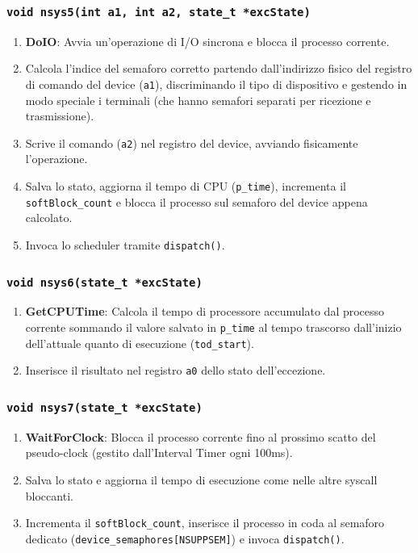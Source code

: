 \documentclass[a4paper,12pt]{article}
\begin{document}
\subsubsection{\texttt{void nsys5(int a1, int a2, state\_t *excState)}}
\begin{enumerate}
    \item \textbf{DoIO}: Avvia un'operazione di I/O sincrona e blocca il processo corrente.
    \item Calcola l'indice del semaforo corretto partendo dall'indirizzo fisico del registro di comando del device (\texttt{a1}), discriminando il tipo di dispositivo e gestendo in modo speciale i terminali (che hanno semafori separati per ricezione e trasmissione).
    \item Scrive il comando (\texttt{a2}) nel registro del device, avviando fisicamente l'operazione.
    \item Salva lo stato, aggiorna il tempo di CPU (\texttt{p\_time}), incrementa il \texttt{softBlock\_count} e blocca il processo sul semaforo del device appena calcolato.
    \item Invoca lo scheduler tramite \texttt{dispatch()}.
\end{enumerate}

\subsubsection{\texttt{void nsys6(state\_t *excState)}}
\begin{enumerate}
    \item \textbf{GetCPUTime}: Calcola il tempo di processore accumulato dal processo corrente sommando il valore salvato in \texttt{p\_time} al tempo trascorso dall'inizio dell'attuale quanto di esecuzione (\texttt{tod\_start}).
    \item Inserisce il risultato nel registro \texttt{a0} dello stato dell'eccezione.
\end{enumerate}

\subsubsection{\texttt{void nsys7(state\_t *excState)}}
\begin{enumerate}
    \item \textbf{WaitForClock}: Blocca il processo corrente fino al prossimo scatto del pseudo-clock (gestito dall'Interval Timer ogni 100ms).
    \item Salva lo stato e aggiorna il tempo di esecuzione come nelle altre syscall bloccanti.
    \item Incrementa il \texttt{softBlock\_count}, inserisce il processo in coda al semaforo dedicato (\texttt{device\_semaphores[NSUPPSEM]}) e invoca \texttt{dispatch()}.
\end{enumerate}
\end{document}
